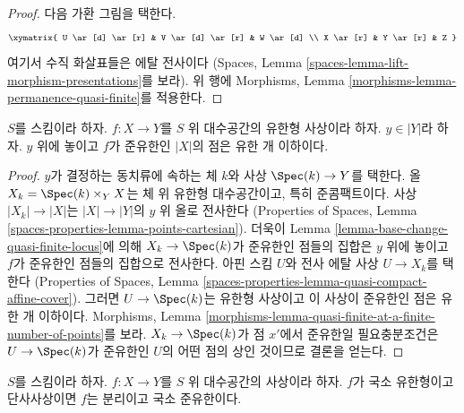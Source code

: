 \begin{proof}
다음 가환 그림을 택한다.
$$
\xymatrix{
U \ar[d] \ar[r] & V \ar[d] \ar[r] & W \ar[d] \\
X \ar[r] & Y \ar[r] & Z
}
$$
여기서 수직 화살표들은 에탈 전사이다
(Spaces, Lemma \ref{spaces-lemma-lift-morphism-presentations}를 보라).
위 행에 Morphisms, Lemma
\ref{morphisms-lemma-permanence-quasi-finite}를 적용한다.
\end{proof}

\begin{lemma}
\label{lemma-quasi-finite-at-a-finite-number-of-points}
$S$를 스킴이라 하자. $f : X \to Y$를 $S$ 위 대수공간의
유한형 사상이라 하자. $y \in |Y|$라 하자.
$y$ 위에 놓이고 $f$가 준유한인 $|X|$의 점은 유한 개 이하이다.
\end{lemma}

\begin{proof}
$y$가 결정하는 동치류에 속하는 체 $k$와 사상
$\Spec(k) \to Y$를 택한다. 올 $X_k = \Spec(k) \times_Y X$는
체 위 유한형 대수공간이고, 특히 준콤팩트이다.
사상 $|X_k| \to |X|$는 $|X| \to |Y|$의 $y$ 위 올로 전사한다
(Properties of Spaces, Lemma
\ref{spaces-properties-lemma-points-cartesian}).
더욱이 Lemma \ref{lemma-base-change-quasi-finite-locus}에 의해
$X_k \to \Spec(k)$가 준유한인 점들의 집합은
$y$ 위에 놓이고 $f$가 준유한인 점들의 집합으로 전사한다.
아핀 스킴 $U$와 전사 에탈 사상 $U \to X_k$를 택한다
(Properties of Spaces, Lemma
\ref{spaces-properties-lemma-quasi-compact-affine-cover}).
그러면 $U \to \Spec(k)$는 유한형 사상이고 이 사상이 준유한인 점은
유한 개 이하이다. Morphisms, Lemma
\ref{morphisms-lemma-quasi-finite-at-a-finite-number-of-points}를 보라.
$X_k \to \Spec(k)$가 점 $x'$에서 준유한일 필요충분조건은
$U \to \Spec(k)$가 준유한인 $U$의 어떤 점의 상인 것이므로
결론을 얻는다.
\end{proof}

\begin{lemma}
\label{lemma-monomorphism-loc-finite-type-loc-quasi-finite}
$S$를 스킴이라 하자.
$f : X \to Y$를 $S$ 위 대수공간의 사상이라 하자.
$f$가 국소 유한형이고 단사사상이면 $f$는 분리이고 국소 준유한이다.
\end{lemma}

